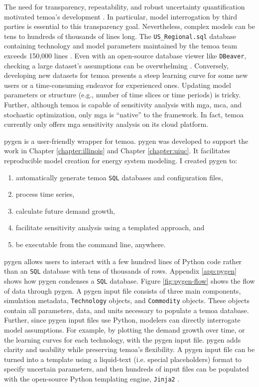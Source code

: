 The need for transparency, repeatability, and robust uncertainty quantification
motivated \gls{temoa}'s development \cite{hunter_modeling_2013}.
In particular, model interrogation by third parties is essential to this transparency
goal. Nevertheless, complex models can be tens to hundreds of thousands of lines long.
The \texttt{US\_Regional.sql} database containing technology and model parameters
maintained by the \gls{temoa} team exceeds
150,000 lines \cite{model_databases_2021}. Even with an open-source
database viewer like \texttt{DBeaver}, checking a large dataset's assumptions can be
overwhelming \cite{rider_dbeaver_nodate}. Conversely, developing new datasets
for \gls{temoa} presents a steep learning curve for some new users or a time-consuming
endeavor for experienced ones. Updating model parameters or structure (e.g., number
of time slices or time periods) is tricky. Further, although \gls{temoa}
is capable of sensitivity analysis with \gls{mga}, \gls{mca}, and stochastic
optimization, only \gls{mga} is ``native'' to the framework. In fact, \gls{temoa}
currently only offers \gls{mga} sensitivity analysis on its cloud platform.

\gls{pygen} is a user-friendly wrapper for \gls{temoa}. \gls{pygen} was developed
to support the work in Chapter \ref{chapter:illinois} and Chapter \ref{chapter:uiuc}.
It facilitates reproducible model creation for energy system modeling.
I created \gls{pygen} to:
\begin{enumerate}
  \item automatically generate \gls{temoa} \texttt{SQL} databases and configuration files,
  \item process time series,
  \item calculate future demand growth,
  \item facilitate sensitivity analysis using a templated approach, and
  \item be executable from the command line, anywhere.
\end{enumerate}
\gls{pygen} allows users to interact with a few hundred lines of Python code rather
than an \texttt{SQL} database with tens of thousands of rows. Appendix \ref{app:pygen}
shows how \gls{pygen} condenses a \texttt{SQL} database.
Figure \ref{fig:pygen-flow} shows the flow of data through \gls{pygen}.
A \gls{pygen} input file consists of three main components, simulation metadata,
\texttt{Technology} objects, and \texttt{Commodity} objects. These objects
contain all parameters, data, and units necessary to populate a \gls{temoa}
database. Further, since \gls{pygen} input files use Python, modelers
can directly interrogate model assumptions. For example, by plotting the demand
growth over time, or the learning curves for each technology, with the \gls{pygen}
input file.
\gls{pygen} adds clarity and usability while preserving \gls{temoa}'s flexibility.
A \gls{pygen} input file can be turned into a template using a liquid-text (i.e.
special placeholders) format to specify uncertain parameters, and then hundreds
of input files can be populated with the open-source Python templating engine,
\texttt{Jinja2} \cite{ronacher_jinja_2022}.

